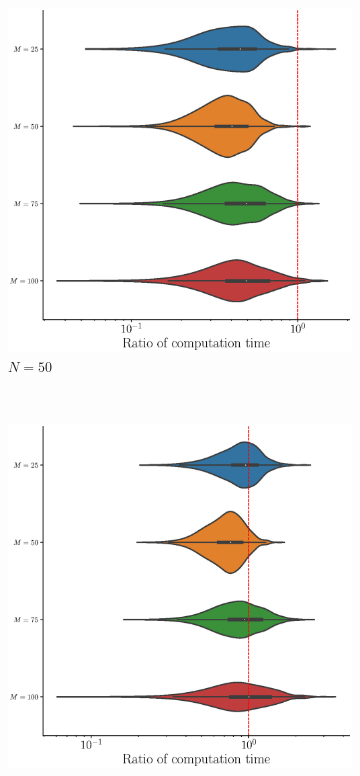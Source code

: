 \begin{results}
\begin{figure}
\begin{subfigure}[b]{0.49\textwidth}
         \includegraphics[width=\textwidth]{figures/scenario_2/computation_time_N50.eps}
         \caption{$N = 50$}
         \label{fig:computation_time_mfd_2d_50}
     \end{subfigure}
     \\
     \begin{subfigure}[b]{0.49\textwidth}
         \centering
         \includegraphics[width=\textwidth]{figures/scenario_2/computation_time_N75.eps}

\end{subfigure}
\end{figure}
\end{results}
